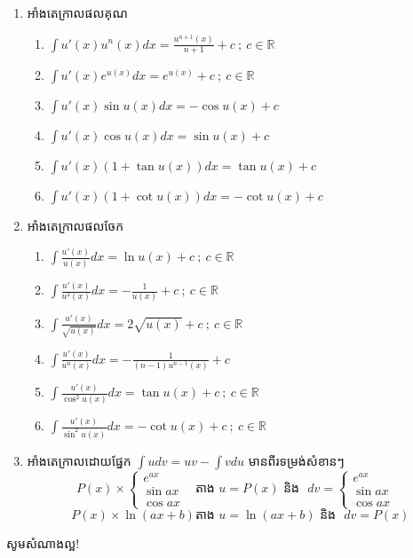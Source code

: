 \documentclass[12pt,a4paper]{article}
\begin{document}
\begin{enumerate}[I]
		\item អាំងតេក្រាលផលគុណ
		\begin{multicols}{2}
			\begin{enumerate}[1]
				\item $\int u'(x)u^n(x)dx=\frac{u^{n+1}(x)}{n+1}+c~;~c\in\mathbb{R}$
				\item $\int u'(x)e^{u(x)}dx=e^{u(x)}+c~;~c\in\mathbb{R}$
				\item $\int u'(x)\sin u(x)dx=-\cos u(x)+c$ 
				\item $\int u'(x)\cos u(x)dx=\sin u(x)+c$ 
				\item $\int u'(x)(1+\tan u(x))dx=\tan u(x)+c$
				\item $\int u'(x)(1+\cot u(x))dx=-\cot u(x)+c$
			\end{enumerate}
		\end{multicols}
		\item អាំងតេក្រាលផលចែក
		\begin{multicols}{2}
			\begin{enumerate}[1]
				\item $\int \frac{u'(x)}{u(x)}dx=\ln u(x)+c~;~c\in\mathbb{R}$
				\item $\int \frac{u'(x)}{u^2(x)}dx=-\frac{1}{u(x)} +c~;~c\in\mathbb{R}$
				\item $\int \frac{u'(x)}{\sqrt{u(x)}}dx=2\sqrt{u(x)} +c~;~c\in\mathbb{R}$
				\item $\int \frac{u'(x)}{u^n(x)}dx=-\frac{1}{(n-1)u^{n-1}(x)} +c$
				\item $\int \frac{u'(x)}{\cos^2 u(x)}dx=\tan u(x) +c~;~c\in\mathbb{R}$
				\item $\int \frac{u'(x)}{\sin^2 u(x)}dx=-\cot u(x) +c~;~c\in\mathbb{R}$
			\end{enumerate}
		\end{multicols}
		\item អាំងតេក្រាលដោយផ្នែក $\int udv=uv-\int vdu$ មានពីរទម្រង់សំខានៗ
			\begin{equation}
				P(x) \times\begin{cases}
				e^{ax} & \\
				\sin ax & \\
				\cos ax &
				\end{cases}
				\text{តាង $u=P(x)$ និង~~}
				dv=\begin{cases}
					e^{ax} & \\
					\sin ax & \\
					\cos ax &
					\end{cases}
			\end{equation}
			\begin{equation}
			P(x)\times\ln(ax+b)
			\text{តាង $u=\ln(ax+b)$ និង~~}
			dv=P(x)
			\end{equation}
	\end{enumerate}
	\begin{center}
		\sffamily\color{black}
		សូមសំណាងល្អ!
	\end{center}\newpage
\end{document}
